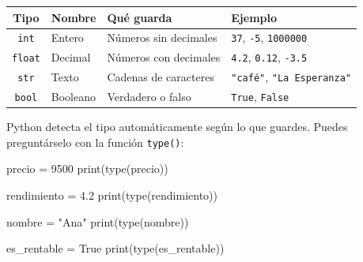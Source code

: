 \documentclass[
  spanish,
  letterpaper,
  DIV=11,
  numbers=noendperiod]{scrreprt}
\newenvironment{Shaded}{\begin{snugshade}}{\end{snugshade}}
\newcommand{\BuiltInTok}[1]{\textcolor[rgb]{0.00,0.23,0.31}{#1}}
\newcommand{\DecValTok}[1]{\textcolor[rgb]{0.68,0.00,0.00}{#1}}
\newcommand{\FloatTok}[1]{\textcolor[rgb]{0.68,0.00,0.00}{#1}}
\newcommand{\NormalTok}[1]{\textcolor[rgb]{0.00,0.23,0.31}{#1}}
\newcommand{\OperatorTok}[1]{\textcolor[rgb]{0.37,0.37,0.37}{#1}}
\newcommand{\StringTok}[1]{\textcolor[rgb]{0.13,0.47,0.30}{#1}}
\newcommand{\VariableTok}[1]{\textcolor[rgb]{0.07,0.07,0.07}{#1}}
\newcounter{none} %
\begin{document}
{\def\LTcaptype{none} %
\begin{longtable}[]{@{}clll@{}}
\toprule\noalign{}
Tipo & Nombre & Qué guarda & Ejemplo \\
\midrule\noalign{}
\endhead
\bottomrule\noalign{}
\endlastfoot
\texttt{int} & Entero & Números sin decimales & \texttt{37},
\texttt{-5}, \texttt{1000000} \\
\texttt{float} & Decimal & Números con decimales & \texttt{4.2},
\texttt{0.12}, \texttt{-3.5} \\
\texttt{str} & Texto & Cadenas de caracteres & \texttt{"café"},
\texttt{"La\ Esperanza"} \\
\texttt{bool} & Booleano & Verdadero o falso & \texttt{True},
\texttt{False} \\
\end{longtable}
}

Python detecta el tipo automáticamente según lo que guardes. Puedes
preguntárselo con la función \texttt{type()}:

\begin{Shaded}
\begin{Highlighting}[]
\NormalTok{precio }\OperatorTok{=} \DecValTok{9500}
\BuiltInTok{print}\NormalTok{(}\BuiltInTok{type}\NormalTok{(precio))}
\end{Highlighting}
\end{Shaded}

\begin{Shaded}
\begin{Highlighting}[]
\NormalTok{rendimiento }\OperatorTok{=} \FloatTok{4.2}
\BuiltInTok{print}\NormalTok{(}\BuiltInTok{type}\NormalTok{(rendimiento))}
\end{Highlighting}
\end{Shaded}

\begin{Shaded}
\begin{Highlighting}[]
\NormalTok{nombre }\OperatorTok{=} \StringTok{"Ana"}
\BuiltInTok{print}\NormalTok{(}\BuiltInTok{type}\NormalTok{(nombre))}
\end{Highlighting}
\end{Shaded}

\begin{Shaded}
\begin{Highlighting}[]
\NormalTok{es\_rentable }\OperatorTok{=} \VariableTok{True}
\BuiltInTok{print}\NormalTok{(}\BuiltInTok{type}\NormalTok{(es\_rentable))}
\end{Highlighting}
\end{Shaded}
\end{document}
